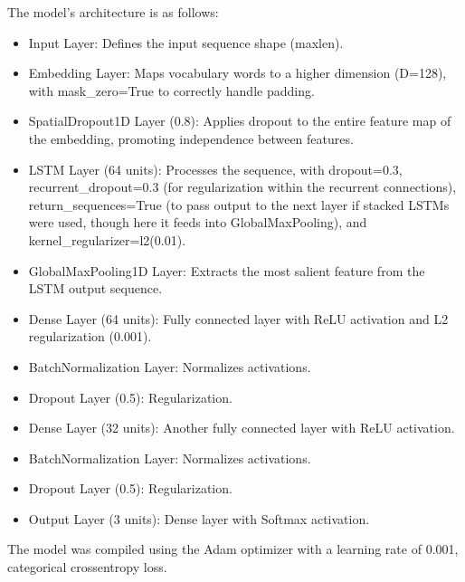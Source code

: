 The model's architecture is as follows:
\begin{itemize}
    \item Input Layer: Defines the input sequence shape (maxlen).
    \item Embedding Layer: Maps vocabulary words to a higher dimension (D=128), with mask\_zero=True to correctly handle padding.
    \item SpatialDropout1D Layer (0.8): Applies dropout to the entire feature map of the embedding, promoting independence between features.
    \item LSTM Layer (64 units): Processes the sequence, with dropout=0.3, recurrent\_dropout=0.3 (for regularization within the recurrent connections), return\_sequences=True (to pass output to the next layer if stacked LSTMs were used, though here it feeds into GlobalMaxPooling), and kernel\_regularizer=l2(0.01).
    \item GlobalMaxPooling1D Layer: Extracts the most salient feature from the LSTM output sequence.
    \item Dense Layer (64 units): Fully connected layer with ReLU activation and L2 regularization (0.001).
    \item BatchNormalization Layer: Normalizes activations.
    \item Dropout Layer (0.5): Regularization.
    \item Dense Layer (32 units): Another fully connected layer with ReLU activation.
    \item BatchNormalization Layer: Normalizes activations.
    \item Dropout Layer (0.5): Regularization.
    \item Output Layer (3 units): Dense layer with Softmax activation.
\end{itemize}

The model was compiled using the Adam optimizer with a learning rate of 0.001, categorical crossentropy loss.

